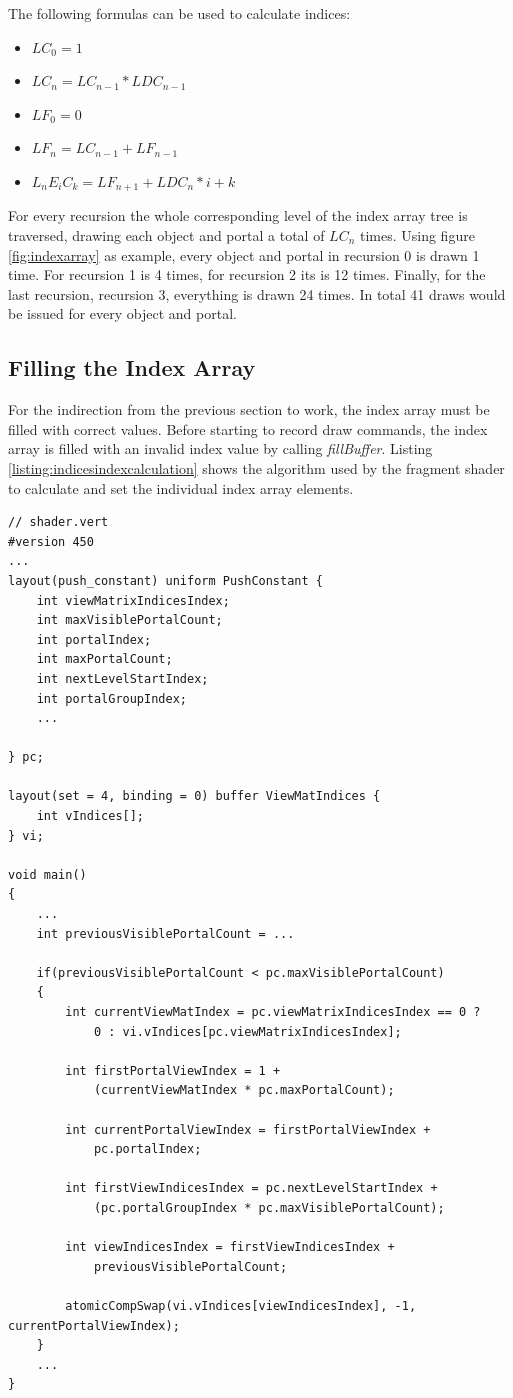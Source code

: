 The following formulas can be used to calculate indices:

\begin{itemize}
	\item $LC_0 = 1$
	\item $LC_n = LC_{n-1} * LDC_{n-1}$
	\item $LF_0 = 0$
	\item $LF_n = LC_{n-1} + LF_{n-1}$
	\item $L_nE_iC_k = LF_{n+1} + LDC_{n} * i + k$
\end{itemize}

For every recursion the whole corresponding level of the index array tree is traversed, drawing each object and portal a total of $LC_n$ times. Using figure \ref{fig:indexarray} as example, every object and portal in recursion 0 is drawn 1 time. For recursion 1 is 4 times, for recursion 2 its is 12 times. Finally, for the last recursion, recursion 3, everything is drawn 24 times. In total 41 draws would be issued for every object and portal.

\subsection{Filling the Index Array}
For the indirection from the previous section to work, the index array must be filled with correct values. Before starting to record draw commands, the index array is filled with an invalid index value by calling \textit{fillBuffer}. Listing \ref{listing:indicesindexcalculation} shows the algorithm used by the fragment shader to calculate and set the individual index array elements.

\begin{lstlisting}[caption={Calculating Indices Index}, label=listing:indicesindexcalculation]
// shader.vert
#version 450
...
layout(push_constant) uniform PushConstant {	
	int viewMatrixIndicesIndex;
	int maxVisiblePortalCount;
	int portalIndex;
	int maxPortalCount;
	int nextLevelStartIndex;
	int portalGroupIndex;
	...

} pc;

layout(set = 4, binding = 0) buffer ViewMatIndices {
	int vIndices[];
} vi;

void main()
{
	...
	int previousVisiblePortalCount = ...
	
	if(previousVisiblePortalCount < pc.maxVisiblePortalCount)
	{
		int currentViewMatIndex = pc.viewMatrixIndicesIndex == 0 ? 
			0 : vi.vIndices[pc.viewMatrixIndicesIndex];
		
		int firstPortalViewIndex = 1 +
			(currentViewMatIndex * pc.maxPortalCount);
		
		int currentPortalViewIndex = firstPortalViewIndex +
			pc.portalIndex;
		
		int firstViewIndicesIndex = pc.nextLevelStartIndex +
			(pc.portalGroupIndex * pc.maxVisiblePortalCount);
			
		int viewIndicesIndex = firstViewIndicesIndex +
			previousVisiblePortalCount;
			
		atomicCompSwap(vi.vIndices[viewIndicesIndex], -1, currentPortalViewIndex);
	}
	...	
}

\end{lstlisting}

